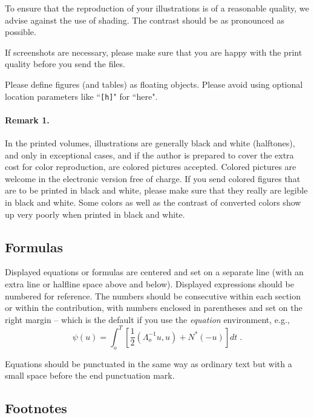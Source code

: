 \documentclass[runningheads]{llncs}
\begin{document}
{To ensure that the reproduction of your illustrations is of a reasonable
quality, we advise against the use of shading. The contrast should be as
pronounced as possible.

If screenshots are necessary, please make sure that you are happy with
the print quality before you send the files.
 

Please define figures (and tables) as floating objects. Please avoid
using optional location parameters like ``\verb+[h]+" for ``here".

\paragraph{Remark 1.}

In the printed volumes, illustrations are generally black and white
(halftones), and only in exceptional cases, and if the author is
prepared to cover the extra cost for color reproduction, are colored
pictures accepted. Colored pictures are welcome in the electronic
version free of charge. If you send colored figures that are to be
printed in black and white, please make sure that they really are
legible in black and white. Some colors as well as the contrast of
converted colors show up very poorly when printed in black and white.

\subsection{Formulas}

Displayed equations or formulas are centered and set on a separate
line (with an extra line or halfline space above and below). Displayed
expressions should be numbered for reference. The numbers should be
consecutive within each section or within the contribution,
with numbers enclosed in parentheses and set on the right margin --
which is the default if you use the \emph{equation} environment, e.g.,
\begin{equation}
  \psi (u) = \int_{o}^{T} \left[\frac{1}{2}
  \left(\Lambda_{o}^{-1} u,u\right) + N^{\ast} (-u)\right] dt \;  .
\end{equation}

Equations should be punctuated in the same way as ordinary
text but with a small space before the end punctuation mark.

\subsection{Footnotes}

}
\end{document}

